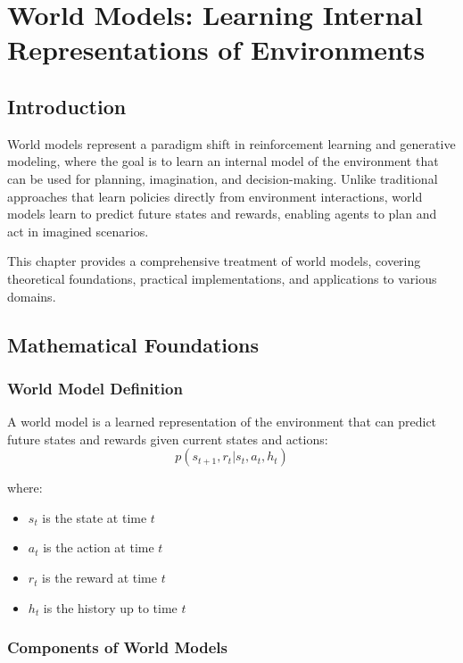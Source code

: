 \chapter{World Models: Learning Internal Representations of Environments}

\section{Introduction}

World models represent a paradigm shift in reinforcement learning and generative modeling, where the goal is to learn an internal model of the environment that can be used for planning, imagination, and decision-making. Unlike traditional approaches that learn policies directly from environment interactions, world models learn to predict future states and rewards, enabling agents to plan and act in imagined scenarios.

This chapter provides a comprehensive treatment of world models, covering theoretical foundations, practical implementations, and applications to various domains.

\section{Mathematical Foundations}

\subsection{World Model Definition}

A world model is a learned representation of the environment that can predict future states and rewards given current states and actions:
\begin{equation}
    p(s_{t+1}, r_t | s_t, a_t, h_t)
\end{equation}

where:
\begin{itemize}
    \item $s_t$ is the state at time $t$
    \item $a_t$ is the action at time $t$
    \item $r_t$ is the reward at time $t$
    \item $h_t$ is the history up to time $t$
\end{itemize}

\subsection{Components of World Models}

